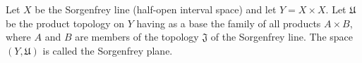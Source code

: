 Let $X$ be the Sorgenfrey line (half-open interval space) and let $Y = X \times X$. Let $\mathfrak{U}$ be the product topology on $Y$ having as a base the family of all products $A \times B$, where $A$ and $B$ are members of the topology $\mathfrak{J}$ of the Sorgenfrey line. The space $(Y, \mathfrak{U})$ is called the Sorgenfrey plane.
